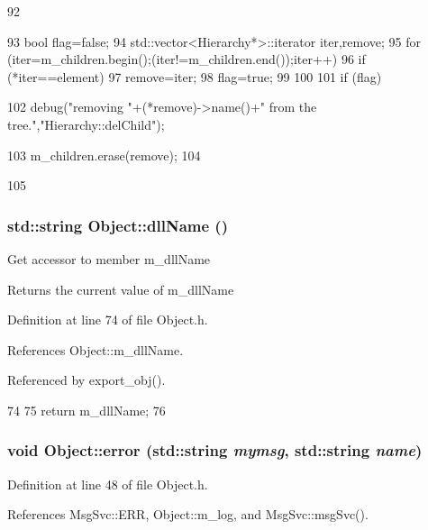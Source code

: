\begin{DoxyCode}
92                                           {
93   bool flag=false;
94   std::vector<Hierarchy*>::iterator iter,remove;
95   for (iter=m_children.begin();(iter!=m_children.end());iter++){
96     if (*iter==element){
97       remove=iter;
98       flag=true;
99     }
100   }
101   if (flag){
102     debug("removing "+(*remove)->name()+" from the tree.","Hierarchy::delChild");
      
103     m_children.erase(remove);
104   }
105 }
\end{DoxyCode}
\hypertarget{classObject_a2e3947f2870094c332d7454117f3ec63}{
\subsubsection[{dllName}]{\setlength{\rightskip}{0pt plus 5cm}std::string Object::dllName ()}}
\label{classObject_a2e3947f2870094c332d7454117f3ec63}
Get accessor to member m\_\-dllName \begin{DoxyReturn}{Returns}
the current value of m\_\-dllName 
\end{DoxyReturn}


Definition at line 74 of file Object.h.

References Object::m\_\-dllName.

Referenced by export\_\-obj().


\begin{DoxyCode}
74                        {
75     return m_dllName;
76   }  
\end{DoxyCode}
\hypertarget{classObject_ad7f6c457733082efa2f9ff5f5c8e119a}{
\subsubsection[{error}]{\setlength{\rightskip}{0pt plus 5cm}void Object::error (std::string {\em mymsg}, \/  std::string {\em name})}}
\label{classObject_ad7f6c457733082efa2f9ff5f5c8e119a}


Definition at line 48 of file Object.h.

References MsgSvc::ERR, Object::m\_\-log, and MsgSvc::msgSvc().


